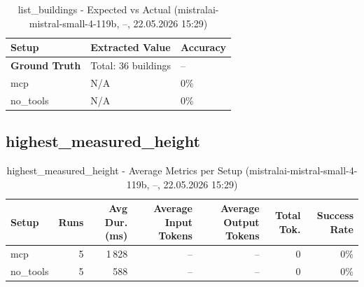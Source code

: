 \documentclass[a4paper,11pt]{article}
\begin{document}
\begin{table}[H]
\centering
\scriptsize
\caption{list\_buildings - Expected vs Actual (mistralai-mistral-small-4-119b, --, 22.05.2026 15:29)}
\begin{tabular}{l l l}
\toprule
Setup & Extracted Value & Accuracy \\
\midrule
\textbf{Ground Truth} & Total: 36 buildings & -- \\
\midrule
mcp & N/A & 0\% \\
no\_tools & N/A & 0\% \\
\bottomrule
\end{tabular}
\end{table}

\clearpage

\subsection{highest\_measured\_height}

\begin{table}[H]
\centering
\scriptsize
\caption{highest\_measured\_height - Average Metrics per Setup (mistralai-mistral-small-4-119b, --, 22.05.2026 15:29)}
\label{tab:combined\_highest\_measured\_height\_metrics\_20260522}
\begin{tabular}{l r r r r r r}
\toprule
Setup & Runs & Avg Dur. (ms) & Average Input Tokens & Average Output Tokens & Total Tok. & Success Rate \\
\midrule
mcp & 5 & 1\,828 & -- & -- & 0 & 0\% \\
no\_tools & 5 & 588 & -- & -- & 0 & 0\% \\
\bottomrule
\end{tabular}
\end{table}
\end{document}
